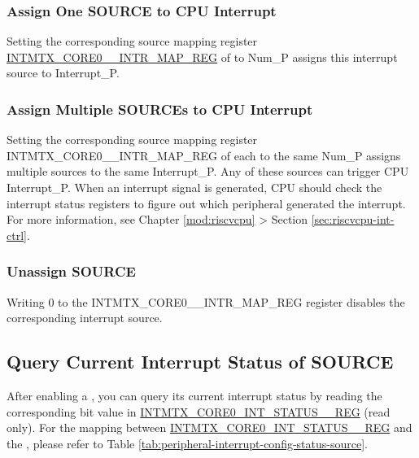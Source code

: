 \documentclass[main\_\_EN.tex]{subfiles}
\begin{document}
\subsubsection{Assign One SOURCE to CPU Interrupt}

Setting the corresponding source mapping register \hyperref[INTMTXCORE0SOURCEINTRMAPREG]{INTMTX\_CORE0\_\_INTR\_MAP\_REG} of  to Num\_P assigns this interrupt source to Interrupt\_P.

\subsubsection{Assign Multiple SOURCEs to CPU Interrupt}

Setting the corresponding source mapping register INTMTX\_CORE0\_\_INTR\_MAP\_REG of each  to the same Num\_P assigns multiple sources to the same Interrupt\_P. Any of these sources can trigger CPU Interrupt\_P. When an interrupt signal is generated, CPU should check the interrupt status registers to figure out which peripheral generated the interrupt. For more information, see Chapter \ref{mod:riscvcpu} \textit{} > Section \ref{sec:riscvcpu-int-ctrl}\textit{}.

\subsubsection{Unassign SOURCE}

Writing 0 to the INTMTX\_CORE0\_\_INTR\_MAP\_REG register disables the corresponding interrupt source.

\subsection{Query Current Interrupt Status of SOURCE}

After enabling a , you can query its current interrupt status by reading the corresponding bit value in \hyperref[regdesc:INTMTXCORE0INTSTATUS0REG]{INTMTX\_CORE0\_INT\_STATUS\_\_REG} (read only). For the mapping between \hyperref[regdesc:INTMTXCORE0INTSTATUS0REG]{INTMTX\_CORE0\_INT\_STATUS\_\_REG} and the , please refer to Table \ref{tab:peripheral-interrupt-config-status-source}.


\end{document}

